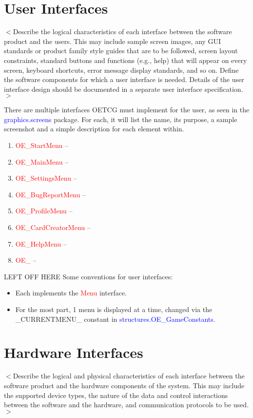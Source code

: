 \documentclass{scrreprt}
\def\bookmrk{LEFT OFF HERE}
\begin{document}
\section{User Interfaces}
$<$Describe the logical characteristics of each interface between the software 
product and the users. This may include sample screen images, any GUI standards 
or product family style guides that are to be followed, screen layout 
constraints, standard buttons and functions (e.g., help) that will appear on 
every screen, keyboard shortcuts, error message display standards, and so on.  
Define the software components for which a user interface is needed. Details of 
the user interface design should be documented in a separate user interface 
specification.$>$

There are multiple interfaces OETCG must implement for the user, as seen in the \textcolor{blue}{graphics.screens} package. For each, it will list the name, its purpose, a sample screenshot and a simple description for each element within.

\begin{enumerate}
	\item \textcolor{red}{OE_StartMenu} -- 
	\item \textcolor{red}{OE_MainMenu} --
	\item \textcolor{red}{OE_SettingsMenu} --
	\item \textcolor{red}{OE_BugReportMenu} --
	\item \textcolor{red}{OE_ProfileMenu} --
	\item \textcolor{red}{OE_CardCreatorMenu} --
	\item \textcolor{red}{OE_HelpMenu} --
	\item \textcolor{red}{OE_} -- 	      
\end{enumerate}
\bookmrk
Some conventions for user interfaces:

\begin{itemize}
	\item Each implements the \textcolor{red}{Menu} interface.
	\item For the most part, 1 menu is displayed at a time, changed via the _CURRENTMENU_ constant in \textcolor{blue}{structures.OE_GameConstants}.
	
\end{itemize}

\section{Hardware Interfaces}
$<$Describe the logical and physical characteristics of each interface between 
the software product and the hardware components of the system. This may include 
the supported device types, the nature of the data and control interactions 
between the software and the hardware, and communication protocols to be 
used.$>$
\end{document}
